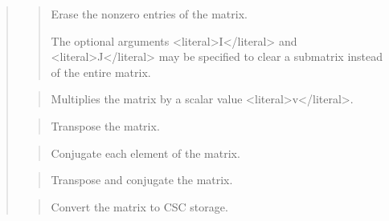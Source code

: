 \documentclass[a4paper,11pt,english]{sphinxmanual}
\begin{document}
\sphinxAtStartPar
{}
\begin{quote}

\sphinxAtStartPar
{}
\begin{quote}

\sphinxAtStartPar
Erase the non\sphinxhyphen{}zero entries of the matrix.

\sphinxAtStartPar
The optional arguments \textless{}literal\textgreater{}I\textless{}/literal\textgreater{} and \textless{}literal\textgreater{}J\textless{}/literal\textgreater{} may be specified to clear a
sub\sphinxhyphen{}matrix instead of the entire matrix.
\end{quote}

\sphinxAtStartPar
{}
\begin{quote}

\sphinxAtStartPar
Multiplies the matrix by a scalar value \textless{}literal\textgreater{}v\textless{}/literal\textgreater{}.
\end{quote}

\sphinxAtStartPar
{}
\begin{quote}

\sphinxAtStartPar
Transpose the matrix.
\end{quote}

\sphinxAtStartPar
{}
\begin{quote}

\sphinxAtStartPar
Conjugate each element of the matrix.
\end{quote}

\sphinxAtStartPar
{}
\begin{quote}

\sphinxAtStartPar
Transpose and conjugate the matrix.
\end{quote}

\sphinxAtStartPar
{}
\begin{quote}

\sphinxAtStartPar
Convert the matrix to CSC storage.


\end{quote}
\end{quote}
\end{document}
